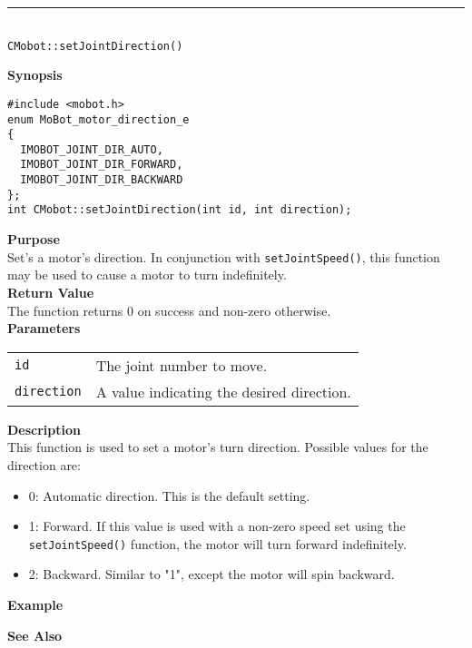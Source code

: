 \noindent
\vspace{5pt}
\rule{4.5in}{0.015in}\\
\noindent
{\LARGE \texttt{CMobot::setJointDirection()}}\\
{}

\noindent
{\bf Synopsis}\\
\begin{verbatim}
#include <mobot.h>
enum MoBot_motor_direction_e
{
  IMOBOT_JOINT_DIR_AUTO,
  IMOBOT_JOINT_DIR_FORWARD,
  IMOBOT_JOINT_DIR_BACKWARD
};
int CMobot::setJointDirection(int id, int direction);
\end{verbatim}

\noindent
{\bf Purpose}\\
Set's a motor's direction. In conjunction with \texttt{setJointSpeed()}, this
function may be used to cause a motor to turn indefinitely.\\

\noindent
{\bf Return Value}\\
The function returns 0 on success and non-zero otherwise.\\

\noindent
{\bf Parameters}
\vspace{-0.1in}
\begin{description}
\item               
\begin{tabular}{p{20 mm}p{145 mm}}
\texttt{id} & The joint number to move. \\
\texttt{direction} & A value indicating the desired direction.
\end{tabular}
\end{description}

\noindent
{\bf Description}\\
This function is used to set a motor's turn direction. Possible values for the
direction are:
\begin{itemize}
\item 0: Automatic direction. This is the default setting. 
\item 1: Forward. If this value is used with a non-zero speed set using the
\texttt{setJointSpeed()} function, the motor will turn forward indefinitely.
\item 2: Backward. Similar to "1", except the motor will spin backward.
\end{itemize}

\noindent
{\bf Example}\\
\noindent

\noindent
{\bf See Also}\\

